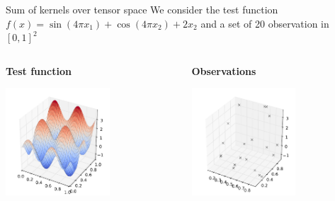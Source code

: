 \documentclass{beamer}
\begin{document}
\begin{frame}{Sum of kernels over tensor space}
We consider the test function $f(x) = \sin( 4 \pi x_1) + \cos( 4 \pi x_2) + 2 x_2$ and a set of 20 observation in $[0,1]^2$ \\ \vspace{5mm}
\begin{columns}[c]
\begin{column}{5cm}
\textbf{Test function}
\begin{center}
\includegraphics[height=4cm]{figures/python/newfromold-productvssum2-predt}
\end{center}
\end{column}
\begin{column}{5cm}
\textbf{Observations}
\begin{center}
\includegraphics[height=4cm]{figures/python/newfromold-productvssum2-preddoe}
\end{center}
\end{column}
\end{columns} 
\vspace{5mm}
\
\end{frame}
\end{document}
